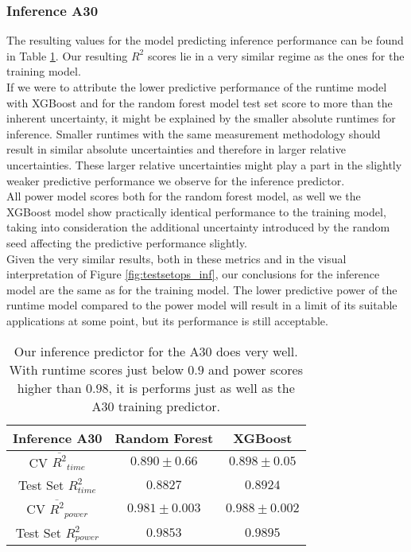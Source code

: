 \subsubsection{Inference A30}

The resulting values for the model predicting inference performance can be found in Table \ref{tab:pred_res_inf}. Our resulting $R^2$ scores lie in a very similar regime as the ones for the training model. \\
If we were to attribute the lower predictive performance of the runtime model with XGBoost and for the random forest model test set score to more than the inherent uncertainty, it might be explained by the smaller absolute runtimes for inference. Smaller runtimes with the same measurement methodology should result in similar absolute uncertainties and therefore in larger relative uncertainties. These larger relative uncertainties might play a part in the slightly weaker predictive performance we observe for the inference predictor.\\
All power model scores both for the random forest model, as well we the XGBoost model show practically identical performance to the training model, taking into consideration the additional uncertainty introduced by the random seed affecting the predictive performance slightly. \\
Given the very similar results, both in these metrics and in the visual interpretation of Figure \ref{fig:testsetops_inf}, our conclusions for the inference model are the same as for the training model. The lower predictive power of the runtime model compared to the power model will result in a limit of its suitable applications at some point, but its performance is still acceptable. 



\begin{table}[h!]
\centering
\begin{tabular}{|c|c|c|}
\hline
 \textbf{Inference A30}& \textbf{Random Forest} & \textbf{XGBoost} \\
\hline
CV $\overline{R^2}_{time}$ & $0.890 \pm 0.66$ &  $0.898 \pm 0.05$ \\
\hline
Test Set $R^2_{time}$ & $0.8827$ & $0.8924$ \\
\hline
CV $\overline{R^2}_{power}$ & $0.981 \pm 0.003$  &  $0.988 \pm 0.002$\\
\hline
Test Set $R^2_{power}$ & $0.9853$ & $0.9895$ \\
\hline
\end{tabular}
\caption{Our inference predictor for the A30 does very well. With runtime scores just below $0.9$ and power scores higher than $0.98$, it is performs just as well as the A30 training predictor. }
\label{tab:pred_res_inf}
\end{table}




